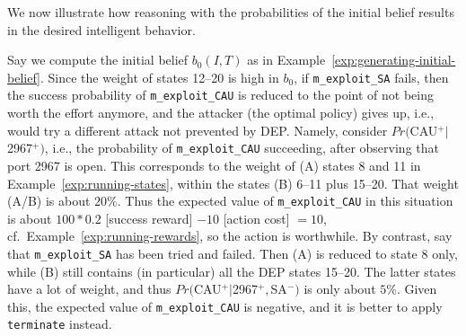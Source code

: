 We now illustrate how reasoning with the probabilities of the initial
belief results in the desired intelligent behavior.

\vspace{-0.05cm}
\begin{example}\label{exp:running-initial-belief-policy}
Say we compute the initial belief $b_0(I,T)$ as in
Example~\ref{exp:generating-initial-belief}. Since the weight of
states 12--20 is high in $b_0$, if {\scriptsize \verb+m_exploit_SA+}
fails, then the success probability of {\scriptsize
  \verb+m_exploit_CAU+} is reduced to the point of not being worth the
effort anymore, and the attacker (the optimal policy) gives up, i.e.,
would try a different attack not prevented by DEP. Namely, consider
$Pr($CAU$^+|$2967$^+)$, i.e., the probability of {\scriptsize
  \verb+m_exploit_CAU+} succeeding, after observing that port 2967 is
open. This corresponds to the weight of (A) states 8 and 11 in
Example~\ref{exp:running-states}, within the states (B) 6--11 plus
15--20. That weight (A/B) is about $20\%$. Thus the expected value of
{\scriptsize \verb+m_exploit_CAU+} in this situation is about
$100*0.2$ [success reward] $- 10$ [action cost] $= 10$,
cf.\ Example~\ref{exp:running-rewards}, so the action is
worthwhile. By contrast, say that {\scriptsize \verb+m_exploit_SA+}
has been tried and failed. Then (A) is reduced to state 8 only, while
(B) still contains (in particular) all the DEP states 15--20. The
latter states have a lot of weight, and thus
$Pr($CAU$^+|$2967$^+,$SA$^-)$ is only about $5\%$. Given this, the
expected value of {\scriptsize \verb+m_exploit_CAU+} is negative, and
it is better to apply {\scriptsize \verb+terminate+} instead.
\end{example}
\vspace{-0.05cm}


